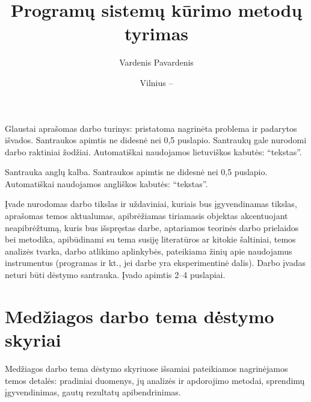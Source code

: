 \documentclass{VUMIFPSbakalaurinis}
\title{Programų sistemų kūrimo metodų tyrimas}
\author{Vardenis Pavardenis}
\date{Vilnius – \the\year}
\begin{document}
\maketitle


\begin{lithuanian}
Glaustai aprašomas darbo turinys: pristatoma nagrinėta problema ir padarytos
išvados. Santraukos apimtis ne didesnė nei 0,5 puslapio. Santraukų gale
nurodomi darbo raktiniai žodžiai. Automatiškai naudojamos lietuviškos kabutės: \enquote{tekstas}.

\end{lithuanian}

\begin{english}
Santrauka anglų kalba. Santraukos apimtis ne didesnė nei 0,5 puslapio. Automatiškai naudojamos angliškos kabutės: \enquote{tekstas}.

\end{english}

\tableofcontents

Įvade nurodomas darbo tikslas ir uždaviniai, kuriais bus įgyvendinamas tikslas,
aprašomas temos aktualumas, apibrėžiamas tiriamasis objektas akcentuojant
neapibrėžtumą, kuris bus išspręstas darbe, aptariamos teorinės darbo prielaidos
bei metodika, apibūdinami su tema susiję literatūros ar kitokie šaltiniai,
temos analizės tvarka, darbo atlikimo aplinkybės, pateikiama žinių apie
naudojamus instrumentus (programas ir kt., jei darbe yra eksperimentinė dalis).
Darbo įvadas neturi būti dėstymo santrauka. Įvado apimtis 2--4 puslapiai.

\section{Medžiagos darbo tema dėstymo skyriai}
Medžiagos darbo tema dėstymo skyriuose išsamiai pateikiamos nagrinėjamos temos
detalės: pradiniai duomenys, jų analizės ir apdorojimo metodai, sprendimų
įgyvendinimas, gautų rezultatų apibendrinimas.
\end{document}
